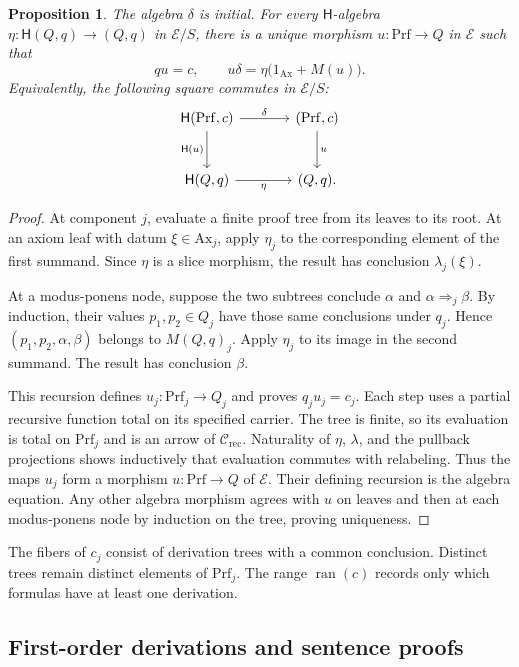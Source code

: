 \documentclass[11pt]{article}
\newtheorem{proposition}[theorem]{Proposition}
\newcommand{\ran}{\operatorname{ran}}
\begin{document}
\begin{proposition}\label{prop:fork-proof-initial}
The algebra $\delta$ is initial. For every
$\mathsf H$-algebra
$\eta:\mathsf H(Q,q)\to(Q,q)$ in $\mathcal E/S$, there is a unique
morphism $u:\mathrm{Prf}\to Q$ in $\mathcal E$ such that
\[
 qu=c,\qquad
 u\delta=\eta\bigl(1_{\mathrm{Ax}}+M(u)\bigr).
\]
Equivalently, the following square commutes in $\mathcal E/S$:
\[
\begin{tikzcd}[column sep=large,row sep=large]
 \mathsf H(\mathrm{Prf},c) \arrow[r,"\delta"]
       \arrow[d,"\mathsf H(u)"'] &
 (\mathrm{Prf},c) \arrow[d,"u"] \\
 \mathsf H(Q,q) \arrow[r,"\eta"'] & (Q,q).
\end{tikzcd}
\]
\end{proposition}
\begin{proof}
At component $j$, evaluate a finite proof tree from its leaves to
its root. At an axiom leaf with datum $\xi\in\mathrm{Ax}_j$, apply
$\eta_j$ to the corresponding element of the first summand.
Since $\eta$ is a slice morphism, the result has conclusion
$\lambda_j(\xi)$.

At a modus-ponens node, suppose the two subtrees conclude
$\alpha$ and $\alpha\Rightarrow_j\beta$.
By induction, their values $p_1,p_2\in Q_j$ have those same
conclusions under $q_j$. Hence
$(p_1,p_2,\alpha,\beta)$ belongs to $M(Q,q)_j$.
Apply $\eta_j$ to its image in the second summand. The result
has conclusion $\beta$.

This recursion defines $u_j:\mathrm{Prf}_j\to Q_j$ and proves
$q_ju_j=c_j$. Each step uses a partial recursive function total
on its specified carrier. The tree is finite, so its evaluation
is total on $\mathrm{Prf}_j$ and is an arrow of
$\mathcal C_{\mathrm{rec}}$.
Naturality of $\eta$, $\lambda$, and the pullback projections
shows inductively that evaluation commutes with relabeling.
Thus the maps $u_j$ form a morphism $u:\mathrm{Prf}\to Q$ of
$\mathcal E$. Their defining recursion is the algebra equation.
Any other algebra morphism agrees with $u$ on leaves and then
at each modus-ponens node by induction on the tree, proving uniqueness.
\end{proof}

The fibers of $c_j$ consist of derivation trees with a common
conclusion. Distinct trees remain distinct elements of
$\mathrm{Prf}_j$. The range $\ran(c)$ records only which formulas
have at least one derivation.


\subsection{First-order derivations and sentence proofs}
\label{app:first-order-proofs}
\end{document}
